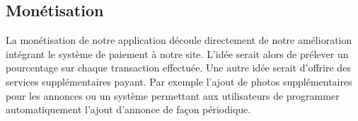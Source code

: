\subsection{Monétisation}
La monétisation de notre application découle directement de notre amélioration intégrant le système de paiement à notre site. L'idée serait alors de prélever un pourcentage sur chaque transaction effectuée. Une autre idée serait d'offrire des services supplémentaires payant. Par exemple l'ajout de photos supplémentaires pour les annonces ou un système permettant aux utilisateurs de programmer automatiquement l'ajout d'annonce de façon périodique.
